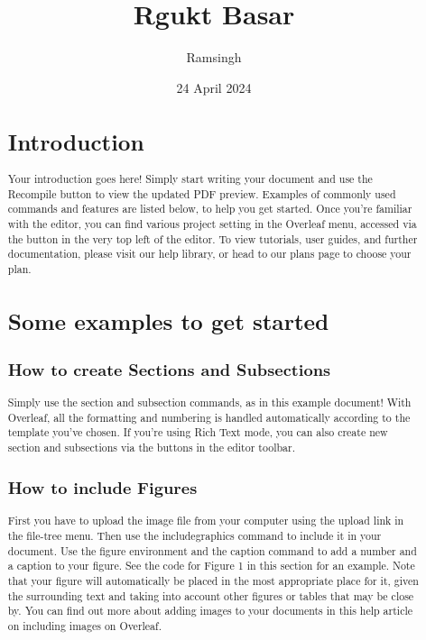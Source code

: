 \documentclass[]{article}
\title{Rgukt Basar}
\author{Ramsingh}
\date{24 April 2024}
\begin{document}
\maketitle

\begin{abstract}
	\section{Introduction}
	Your introduction goes here! Simply start writing your document and use the Recompile button to
	view the updated PDF preview. Examples of commonly used commands and features are listed below,
	to help you get started.
	Once you’re familiar with the editor, you can find various project setting in the Overleaf menu,
	accessed via the button in the very top left of the editor. To view tutorials, user guides, and further
	documentation, please visit our help library, or head to our plans page to choose your plan.
	
	\section{Some examples to get started}
	\subsection{How to create Sections and Subsections}
	Simply use the section and subsection commands, as in this example document! With Overleaf, all
	the formatting and numbering is handled automatically according to the template you’ve chosen. If
	you’re using Rich Text mode, you can also create new section and subsections via the buttons in the
	editor toolbar.
	\subsection{How to include Figures}
	First you have to upload the image file from your computer using the upload link in the file-tree menu.
	Then use the includegraphics command to include it in your document. Use the figure environment
	and the caption command to add a number and a caption to your figure. See the code for Figure 1 in
	this section for an example.
	Note that your figure will automatically be placed in the most appropriate place for it, given the
	surrounding text and taking into account other figures or tables that may be close by. You can find
	out more about adding images to your documents in this help article on including images on Overleaf.
	

\end{abstract}
\end{document}
